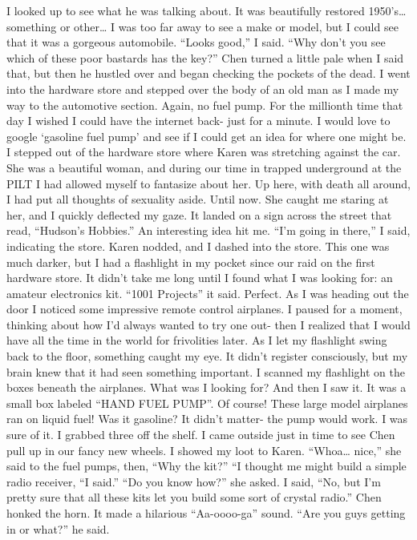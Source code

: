 \documentclass[a4paper]{article}
\begin{document}
I looked up to see what he was talking about. It was beautifully restored 1950’s… something or other… I was too far away to see a make or model, but I could see that it was a gorgeous automobile. “Looks good,” I said. “Why don’t you see which of these poor bastards has the key?”
Chen turned a little pale when I said that, but then he hustled over and began checking the pockets of the dead. I went into the hardware store and stepped over the body of an old man as I made my way to the automotive section. Again, no fuel pump.
For the millionth time that day I wished I could have the internet back- just for a minute. I would love to google ‘gasoline fuel pump’ and see if I could get an idea for where one might be.
I stepped out of the hardware store where Karen was stretching against the car. She was a beautiful woman, and during our time in trapped underground at the PILT I had allowed myself to fantasize about her. Up here, with death all around, I had put all thoughts of sexuality aside. Until now.
She caught me staring at her, and I quickly deflected my gaze. It landed on a sign across the street that read, “Hudson’s Hobbies.” An interesting idea hit me. “I’m going in there,” I said, indicating the store.
Karen nodded, and I dashed into the store. This one was much darker, but I had a flashlight in my pocket since our raid on the first hardware store. It didn’t take me long until I found what I was looking for: an amateur electronics kit. “1001 Projects” it said. Perfect.
As I was heading out the door I noticed some impressive remote control airplanes. I paused for a moment, thinking about how I’d always wanted to try one out- then I realized that I would have all the time in the world for frivolities later. As I let my flashlight swing back to the floor, something caught my eye. It didn’t register consciously, but my brain knew that it had seen something important.
I scanned my flashlight on the boxes beneath the airplanes. What was I looking for? And then I saw it. It was a small box labeled “HAND FUEL PUMP”. Of course! These large model airplanes ran on liquid fuel! Was it gasoline? It didn’t matter- the pump would work. I was sure of it. I grabbed three off the shelf.
I came outside just in time to see Chen pull up in our fancy new wheels. I showed my loot to Karen. “Whoa… nice,” she said to the fuel pumps, then, “Why the kit?”
“I thought me might build a simple radio receiver, “I said.”
“Do you know how?” she asked.
I said, “No, but I’m pretty sure that all these kits let you build some sort of crystal radio.”
Chen honked the horn. It made a hilarious “Aa-oooo-ga” sound. “Are you guys getting in or what?” he said.
\end{document}
